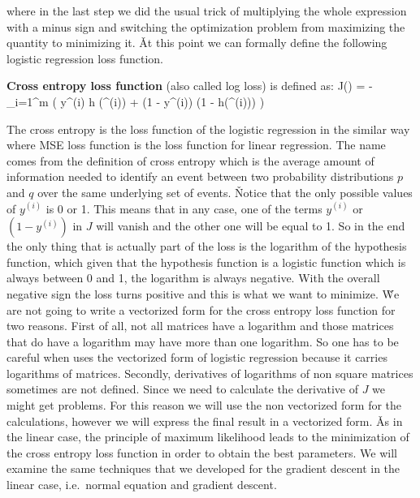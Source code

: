 where in the last step we did the usual trick of multiplying the whole expression with a minus sign and switching the
optimization problem from maximizing the quantity to minimizing it. \v

At this point we can formally define the following logistic regression loss function.

\textbf{Cross entropy loss function} (also called log loss) is defined as:
\bse
J() = -  \sum_{i=1}^{m} \Big( y^{(i)} \cdot \ln h (^{(i)}) + (1 - {y^{(i)}})
\cdot \ln (1 - h(^{(i)})) \Big)
\ese
\ed

The cross entropy is the loss function of the logistic regression in the similar way where MSE loss function is the
loss function for linear regression. The name  comes from the definition of cross entropy which is
the average amount of information needed to identify an event between two probability distributions $p$ and $q$ over
the same underlying set of events. \v

Notice that the only possible values of $y^{(i)}$ is 0 or 1. This means that in any case, one of the terms $y^{(i)}$
or $(1-y^{(i)})$ in $J$ will vanish and the other one will be equal to 1. So in the end the only thing that is
actually part of the loss is the logarithm of the hypothesis function, which given that the hypothesis function is a
logistic function which is always between 0 and 1, the logarithm is always negative. With the overall negative sign
the loss turns positive and this is what we want to minimize. \v

We are not going to write a vectorized form for the cross entropy loss function for two reasons. First of all, not
all matrices have a logarithm and those matrices that do have a logarithm may have more than one logarithm. So one
has to be careful when uses the vectorized form of logistic regression because it carries logarithms of matrices.
Secondly, derivatives of logarithms of non square matrices sometimes are not defined. Since we need to calculate the
derivative of $J$ we might get problems. For this reason we will use the non vectorized form for the calculations,
however we will express the final result in a vectorized form. \v

As in the linear case, the principle of maximum likelihood leads to the minimization of the cross entropy loss
function in order to obtain the best parameters. We will examine the same techniques that we developed for the
gradient descent in the linear case, i.e.\ normal equation and gradient descent.

